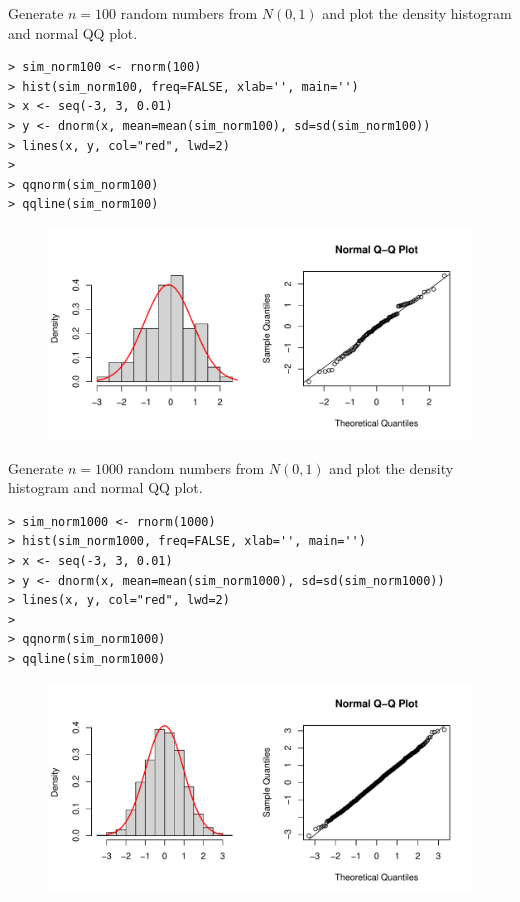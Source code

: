 \documentclass[10pt]{beamer}
\begin{document}
\begin{frame}[fragile]
Generate $n=100$ random numbers from $N(0,1)$ and plot the density histogram and normal QQ plot.

\scriptsize
\begin{verbatim}
> sim_norm100 <- rnorm(100)
> hist(sim_norm100, freq=FALSE, xlab='', main='')
> x <- seq(-3, 3, 0.01)
> y <- dnorm(x, mean=mean(sim_norm100), sd=sd(sim_norm100))
> lines(x, y, col="red", lwd=2)
> 
> qqnorm(sim_norm100)
> qqline(sim_norm100)
\end{verbatim}

\begin{figure}[htbp]
\centering
\includegraphics[scale=0.5]{figure/simnorm100.pdf}
\end{figure}
\end{frame}


\begin{frame}[fragile]
Generate $n=1000$ random numbers from $N(0,1)$ and plot the density histogram and normal QQ plot.

\scriptsize
\begin{verbatim}
> sim_norm1000 <- rnorm(1000)
> hist(sim_norm1000, freq=FALSE, xlab='', main='')
> x <- seq(-3, 3, 0.01)
> y <- dnorm(x, mean=mean(sim_norm1000), sd=sd(sim_norm1000))
> lines(x, y, col="red", lwd=2)
> 
> qqnorm(sim_norm1000)
> qqline(sim_norm1000)
\end{verbatim}

\begin{figure}[htbp]
\centering
\includegraphics[scale=0.5]{figure/simnorm1000.pdf}
\end{figure}
\end{frame}
\end{document}
